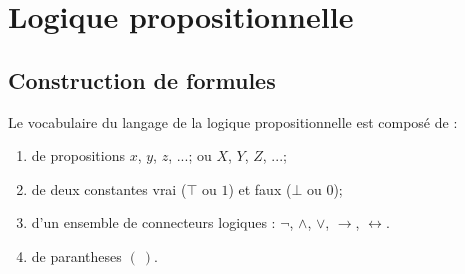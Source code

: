 \documentclass[a4paper, 12pt]{extarticle}
\begin{document}


\makemargins %
\makefrontpage
\maketoc


% 


\section{Logique propositionnelle}
\subsection{Construction de formules}
Le vocabulaire du langage de la logique propositionnelle est composé de :
\begin{enumerate}
  \item de propositions $x$, $y$, $z$, ...; ou $X$, $Y$, $Z$, ...;
  \item de deux constantes vrai ($\top$ ou $1$) et faux ($\bot$ ou $0$);
  \item d'un ensemble de connecteurs logiques : $\neg$, $\wedge$, $\vee$, $\rightarrow$, $\leftrightarrow$.
  \item de parantheses $(\ )$.
\end{enumerate}
\end{document}
